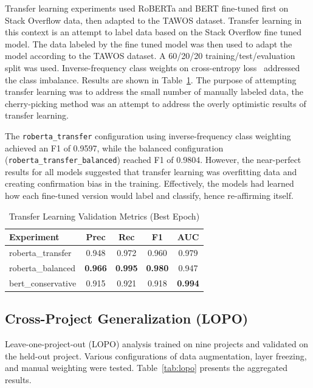\documentclass[preprint,12pt]{elsarticle}
\begin{document}
Transfer learning experiments used RoBERTa and BERT fine-tuned first on Stack Overflow data, then adapted to the TAWOS dataset. Transfer learning in this context is an attempt to label data based on the Stack Overflow fine tuned model. The data labeled by the fine tuned model was then used to adapt the model according to the TAWOS dataset. A 60/20/20 training/test/evaluation split was used. Inverse-frequency class weights on cross-entropy loss~\cite{mao2023} addressed the class imbalance. Results are shown in Table~\ref{tab:transfer}. The purpose of attempting transfer learning was to address the small number of manually labeled data, the cherry-picking method was an attempt to address the overly optimistic results of transfer learning.

The \texttt{roberta\_transfer} configuration using inverse-frequency class weighting achieved an F1 of 0.9597, while the balanced configuration (\texttt{roberta\_transfer\_balanced}) reached F1 of 0.9804. However, the near-perfect results for all models suggested that transfer learning was overfitting data and creating confirmation bias in the training. Effectively, the models had learned how each fine-tuned version would label and classify, hence re-affirming itself.

\begin{table}[t]
\centering
\begin{tabular}{lcccc}
\toprule
\textbf{Experiment} & \textbf{Prec} & \textbf{Rec} & \textbf{F1} & \textbf{AUC} \\
\midrule
roberta\_transfer & 0.948 & 0.972 & 0.960 & 0.979 \\
roberta\_balanced & \textbf{0.966} & \textbf{0.995} & \textbf{0.980} & 0.947 \\
bert\_conservative & 0.915 & 0.921 & 0.918 & \textbf{0.994} \\
\bottomrule
\end{tabular}
\caption{Transfer Learning Validation Metrics (Best Epoch)}
\label{tab:transfer}
\end{table}

\subsection{Cross-Project Generalization (LOPO)}

Leave-one-project-out (LOPO) analysis trained on nine projects and validated on the held-out project. Various configurations of data augmentation, layer freezing, and manual weighting were tested. Table~\ref{tab:lopo} presents the aggregated results.
\end{document}
